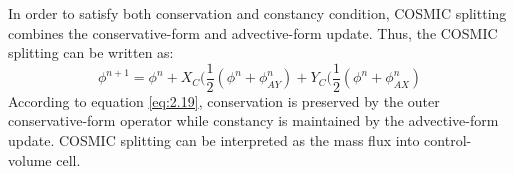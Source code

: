 In order to satisfy both conservation and constancy condition, COSMIC splitting \citep{Leonard1996} combines the conservative-form and advective-form update. Thus, the COSMIC splitting can be written as:
\begin{equation} \label{eq:2.19}
\phi^{n+1} = \phi^n+X_{\scriptscriptstyle C}(\frac{1}{2}(\phi^n + \phi^n _{\scriptscriptstyle AY}) +Y_{\scriptscriptstyle C}(\frac{1}{2}(\phi^n + \phi^n _{\scriptscriptstyle AX})
\end{equation}
According to equation \ref{eq:2.19}, conservation is preserved by the outer conservative-form operator while constancy is maintained by the advective-form update. COSMIC splitting can be interpreted as the mass flux into control-volume cell.%

